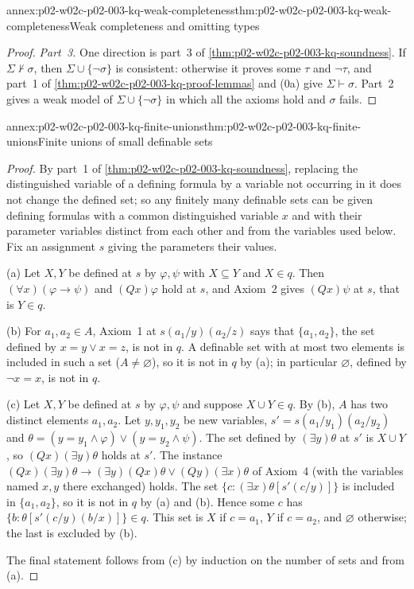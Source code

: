\begin{annexitem}{annex:p02-w02c-p02-003-kq-weak-completeness}{thm:p02-w02c-p02-003-kq-weak-completeness}{Weak completeness and omitting types}
\begin{proof}
\emph{Part~3.}  One direction is part~3 of
\cref{thm:p02-w02c-p02-003-kq-soundness}.  If \(\Sigma\not\vdash\sigma\),
then \(\Sigma\cup\{\neg\sigma\}\) is consistent: otherwise it proves some
\(\tau\) and \(\neg\tau\), and part~1 of
\cref{thm:p02-w02c-p02-003-kq-proof-lemmas} and (0a) give
\(\Sigma\vdash\sigma\).  Part~2 gives a weak model of
\(\Sigma\cup\{\neg\sigma\}\) in which all the axioms hold and \(\sigma\)
fails.
\end{proof}
\end{annexitem}

\begin{annexitem}{annex:p02-w02c-p02-003-kq-finite-unions}{thm:p02-w02c-p02-003-kq-finite-unions}{Finite unions of small definable sets}
\begin{proof}
By part~1 of \cref{thm:p02-w02c-p02-003-kq-soundness}, replacing the
distinguished variable of a defining formula by a variable not occurring in
it does not change the defined set; so any finitely many definable sets
can be given defining formulas with a common distinguished variable \(x\)
and with their parameter variables distinct from each other and from the
variables used below.  Fix an assignment \(s\) giving the parameters their
values.

(a) Let \(X,Y\) be defined at \(s\) by \(\varphi,\psi\) with \(X\subseteq
Y\) and \(X\in q\).  Then \((\forall x)(\varphi\to\psi)\) and
\((Qx)\varphi\) hold at \(s\), and Axiom~2 gives \((Qx)\psi\) at \(s\), that
is \(Y\in q\).

(b) For \(a_1,a_2\in A\), Axiom~1 at \(s(a_1/y)(a_2/z)\) says that
\(\{a_1,a_2\}\), the set defined by \(x=y\lor x=z\), is not in \(q\).  A
definable set with at most two elements is included in such a set
(\(A\neq\varnothing\)), so it is not in \(q\) by (a); in particular
\(\varnothing\), defined by \(\neg x=x\), is not in \(q\).

(c) Let \(X,Y\) be defined at \(s\) by \(\varphi,\psi\) and suppose
\(X\cup Y\in q\).  By (b), \(A\) has two distinct elements \(a_1,a_2\).  Let
\(y,y_1,y_2\) be new variables, \(s'=s(a_1/y_1)(a_2/y_2)\) and
\(\theta=(y=y_1\land\varphi)\lor(y=y_2\land\psi)\).  The set defined by
\((\exists y)\theta\) at \(s'\) is \(X\cup Y\), so \((Qx)(\exists y)\theta\)
holds at \(s'\).  The instance
\((Qx)(\exists y)\theta\to(\exists y)(Qx)\theta\lor(Qy)(\exists x)\theta\)
of Axiom~4 (with the variables named \(x,y\) there exchanged) holds.  The
set \(\{c:(\exists x)\theta[s'(c/y)]\}\) is included in \(\{a_1,a_2\}\), so
it is not in \(q\) by (a) and (b).  Hence some \(c\) has
\(\{b:\theta[s'(c/y)(b/x)]\}\in q\).  This set is \(X\) if \(c=a_1\), \(Y\)
if \(c=a_2\), and \(\varnothing\) otherwise; the last is excluded by (b).

The final statement follows from (c) by induction on the number of sets
and from (a).
\end{proof}
\end{annexitem}

